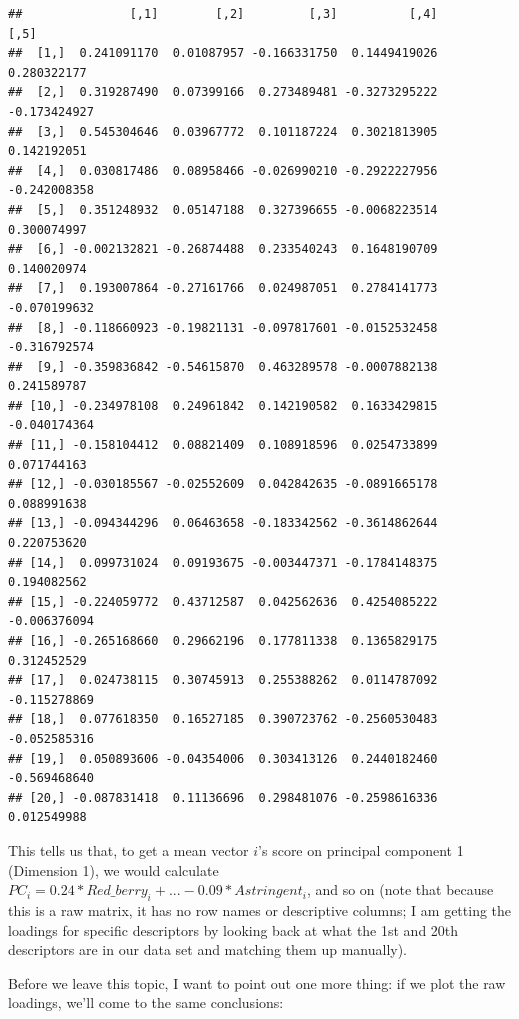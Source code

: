 \documentclass[
]{book}
\begin{document}
\begin{verbatim}
##               [,1]        [,2]         [,3]          [,4]         [,5]
##  [1,]  0.241091170  0.01087957 -0.166331750  0.1449419026  0.280322177
##  [2,]  0.319287490  0.07399166  0.273489481 -0.3273295222 -0.173424927
##  [3,]  0.545304646  0.03967772  0.101187224  0.3021813905  0.142192051
##  [4,]  0.030817486  0.08958466 -0.026990210 -0.2922227956 -0.242008358
##  [5,]  0.351248932  0.05147188  0.327396655 -0.0068223514  0.300074997
##  [6,] -0.002132821 -0.26874488  0.233540243  0.1648190709  0.140020974
##  [7,]  0.193007864 -0.27161766  0.024987051  0.2784141773 -0.070199632
##  [8,] -0.118660923 -0.19821131 -0.097817601 -0.0152532458 -0.316792574
##  [9,] -0.359836842 -0.54615870  0.463289578 -0.0007882138  0.241589787
## [10,] -0.234978108  0.24961842  0.142190582  0.1633429815 -0.040174364
## [11,] -0.158104412  0.08821409  0.108918596  0.0254733899  0.071744163
## [12,] -0.030185567 -0.02552609  0.042842635 -0.0891665178  0.088991638
## [13,] -0.094344296  0.06463658 -0.183342562 -0.3614862644  0.220753620
## [14,]  0.099731024  0.09193675 -0.003447371 -0.1784148375  0.194082562
## [15,] -0.224059772  0.43712587  0.042562636  0.4254085222 -0.006376094
## [16,] -0.265168660  0.29662196  0.177811338  0.1365829175  0.312452529
## [17,]  0.024738115  0.30745913  0.255388262  0.0114787092 -0.115278869
## [18,]  0.077618350  0.16527185  0.390723762 -0.2560530483 -0.052585316
## [19,]  0.050893606 -0.04354006  0.303413126  0.2440182460 -0.569468640
## [20,] -0.087831418  0.11136696  0.298481076 -0.2598616336  0.012549988
\end{verbatim}

This tells us that, to get a mean vector \(i\)'s score on principal component 1 (Dimension 1), we would calculate \(PC_i = 0.24 * Red\_berry_i + ... -0.09 * Astringent_i\), and so on (note that because this is a raw matrix, it has no row names or descriptive columns; I am getting the loadings for specific descriptors by looking back at what the 1st and 20th descriptors are in our data set and matching them up manually).

Before we leave this topic, I want to point out one more thing: if we plot the raw loadings, we'll come to the same conclusions:
\end{document}
